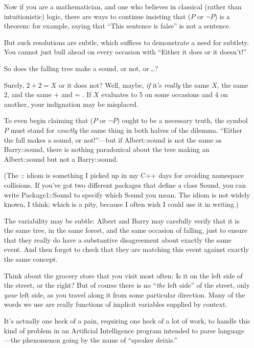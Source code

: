 { Now if you are a mathematician, and one who believes in classical
(rather than intuitionistic) logic, there are ways to continue
insisting that ($P$ or $\lnot P$) is a theorem: for example, saying
that ``This sentence is false'' is
not a sentence.


 But such resolutions are subtle, which suffices to demonstrate a
need for subtlety. You cannot just bull ahead on every occasion with
``Either it does or it
doesn't!''


 So does the falling tree make a sound, or not, or\,\ldots ?


 Surely, $2 + 2 = X$ or it does not? Well, maybe, \textit{if}
it's \textit{really} the same $X$, the same 2, and the
same + and = . If $X$ evaluates to 5 on some occasions and 4 on another,
your indignation may be misplaced.


 To even begin claiming that ($P$ or $\lnot P$) ought to be a
necessary truth, the symbol $P$ must stand for \textit{exactly} the same
thing in both halves of the dilemma. ``Either the fall
makes a sound, or not!''---but if Albert::sound is
not the same as Barry::sound, there is nothing paradoxical about the
tree making an Albert::sound but not a Barry::sound.


 (The :: idiom is something I picked up in my C++ days for avoiding
namespace collisions. If you've got two different
packages that define a class Sound, you can write Package1::Sound to
specify which Sound you mean. The idiom is not widely known, I think;
which is a pity, because I often wish I could use it in writing.)


 The variability may be subtle: Albert and Barry may carefully
verify that it is the same tree, in the same forest, and the same
occasion of falling, just to ensure that they really do have a
substantive disagreement about exactly the same event. And then forget
to check that they are matching this event against exactly the same
concept.


 Think about the grocery store that you visit most often: Is it on
the left side of the street, or the right? But of course there is no
``\textit{the} left side'' of the
street, only \textit{your} left side, as you travel along it from some
particular direction. Many of the words we use are really functions of
implicit variables supplied by context.


 It's actually one heck of a pain, requiring one
heck of a lot of work, to handle this kind of problem in an Artificial
Intelligence program intended to parse language---the phenomenon going
by the name of ``speaker deixis.''


}
